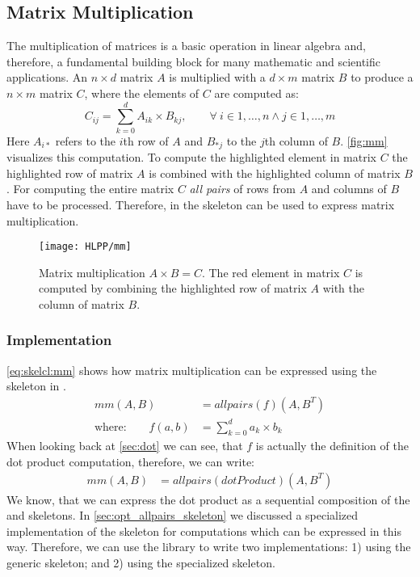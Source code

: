 \subsection{Matrix Multiplication}

The multiplication of matrices is a basic operation in linear algebra and, therefore, a fundamental building block for many mathematic and scientific applications.
An $n\times d$ matrix $A$ is multiplied with a $d\times m$ matrix $B$ to produce a $n\times m$ matrix $C$, where the elements of $C$ are computed as:
\begin{equation*}
  C_{ij} = \sum_{k=0}^{d} A_{ik} \times B_{kj}, \qquad \forall\ i \in 1, \ldots, n \wedge j \in 1, \ldots, m
\end{equation*}
Here $A_{i*}$ refers to the $i$th row of $A$ and $B_{*j}$ to the $j$th column of $B$.
\autoref{fig:mm} visualizes this computation.
To compute the highlighted element in matrix $C$ the highlighted row of matrix $A$ is combined with the highlighted column of matrix $B$.
For computing the entire matrix $C$ \emph{all pairs} of rows from $A$ and columns of $B$ have to be processed.
Therefore, in \SkelCL the \allpairs skeleton can be used to express matrix multiplication.

\begin{figure}[tb]
  \centering
  \texttt{[image: HLPP/mm]}
  \caption{Matrix multiplication $A\times B = C$.
           The red element in matrix $C$ is computed by combining the highlighted row of matrix $A$ with the column of matrix $B$.}
  \label{fig:mm}
\end{figure}


\subsubsection*{\SkelCL Implementation}
\autoref{eq:skelcl:mm} shows how matrix multiplication can be expressed using the \allpairs skeleton in \SkelCL.
\begin{align}
  \label{eq:skelcl:mm}
  mm(A, B) &= allpairs(f)(A, B^T)\\
  \text{where:} \qquad f(a, b) &= \sum_{k=0}^d a_k \times b_k \nonumber
\end{align}
When looking back at \autoref{sec:dot} we can see, that $f$ is actually the definition of the dot product computation, therefore, we can write:
\begin{align}
  mm(A, B) &= allpairs(dotProduct)(A, B^T)
  \label{eq:skelcl:mm:dot}
\end{align}
We know, that we can express the dot product as a sequential composition of the \zip and \reduce skeletons.
In \autoref{sec:opt_allpairs_skeleton} we discussed a specialized implementation of the \allpairs skeleton for computations which can be expressed in this way.
Therefore, we can use the \SkelCL library to write two implementations:
1) using the generic \allpairs skeleton; and 2) using the specialized \allpairs skeleton.

